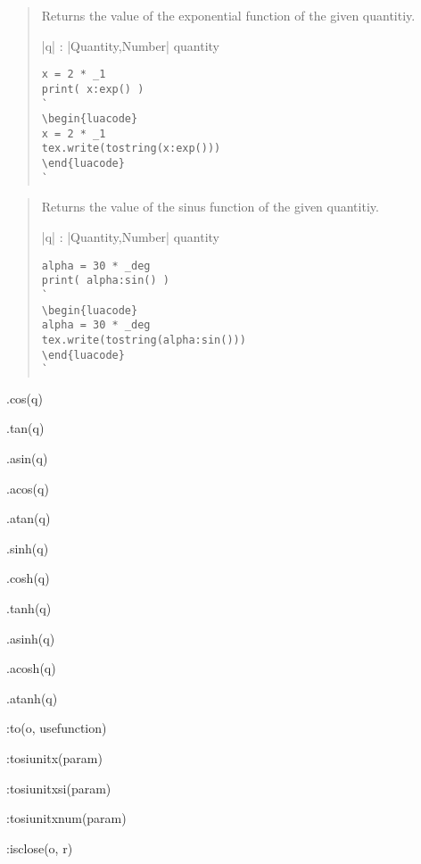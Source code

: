 \documentclass{ltxdoc}
\begin{document}
\begin{quote}
  Returns the value of the exponential function of the given quantitiy.

  \begin{description}
  \item |q| : |Quantity,Number| quantity
  \end{description}

\begin{lstlisting}
x = 2 * _1
print( x:exp() )
`
\begin{luacode}
x = 2 * _1
tex.write(tostring(x:exp()))
\end{luacode}
`
\end{lstlisting}

\end{quote}



\begin{quote}
  Returns the value of the sinus function of the given quantitiy.

  \begin{description}
  \item |q| : |Quantity,Number| quantity
  \end{description}

\begin{lstlisting}
alpha = 30 * _deg
print( alpha:sin() )
`
\begin{luacode}
alpha = 30 * _deg
tex.write(tostring(alpha:sin()))
\end{luacode}
`
\end{lstlisting}

\end{quote}


\newpage



.cos(q)

.tan(q)

.asin(q)

.acos(q)

.atan(q)

.sinh(q)

.cosh(q)

.tanh(q)

.asinh(q)

.acosh(q)

.atanh(q)

:to(o, usefunction)

:tosiunitx(param)

:tosiunitxsi(param)

:tosiunitxnum(param)

:isclose(o, r)
\end{document}
